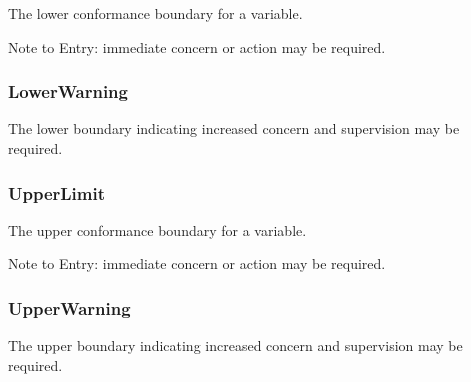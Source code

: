 The lower conformance boundary for a variable.

Note to Entry: immediate concern or action may be required.



\subsubsection{LowerWarning}
\label{sec:LowerWarning}



The lower boundary indicating increased concern and supervision may be required.



\subsubsection{UpperLimit}
\label{sec:UpperLimit}



The upper conformance boundary for a variable.

Note to Entry: immediate concern or action may be required.




\subsubsection{UpperWarning}
\label{sec:UpperWarning}



The upper boundary indicating increased concern and supervision may be required.


